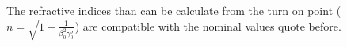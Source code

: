 The refractive indices than can be calculate from the turn on point ($n =  \sqrt{1+\frac{1}{\beta_0^2\gamma_0^2}}$) are compatible with the nominal values quote before.



